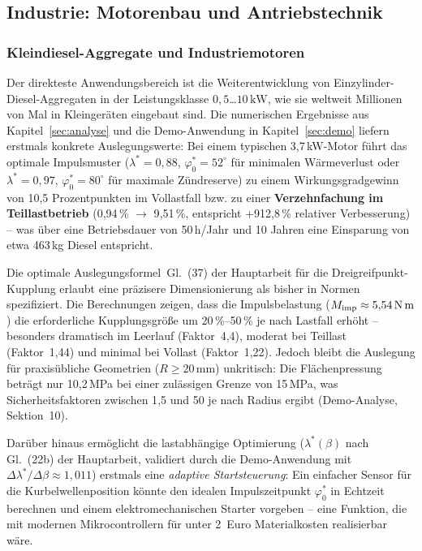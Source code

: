 ﻿\documentclass[a4paper,12pt]{article}
\begin{document}
\subsection{Industrie: Motorenbau und Antriebstechnik}

\subsubsection{Kleindiesel-Aggregate und Industriemotoren}

Der direkteste Anwendungsbereich ist die Weiterentwicklung von
Einzylinder-Diesel-Aggregaten in der Leistungsklasse
$0{,}5$\ldots$10\,\text{kW}$, wie sie weltweit Millionen von Mal in
Kleingeräten eingebaut sind. Die numerischen Ergebnisse aus
Kapitel~\ref{sec:analyse} und die Demo-Anwendung in Kapitel~\ref{sec:demo}
liefern erstmals konkrete Auslegungswerte: Bei einem typischen 3,7\,kW-Motor
führt das optimale Impulsmuster ($\lambda^* = 0{,}88$, $\varphi_0^* = 52^\circ$
für minimalen Wärmeverlust oder $\lambda^* = 0{,}97$, $\varphi_0^* = 80^\circ$
für maximale Zündreserve) zu einem Wirkungsgradgewinn von 10{,}5 Prozentpunkten
im Vollastfall bzw. zu einer \textbf{Verzehnfachung im Teillastbetrieb}
(0{,}94\,\% $\rightarrow$ 9{,}51\,\%, entspricht +912{,}8\,\% relativer
Verbesserung) -- was über eine Betriebsdauer von 50\,h/Jahr und 10 Jahren
eine Einsparung von etwa 463\,kg Diesel entspricht.

Die optimale Auslegungsformel~Gl.~(37) der Hauptarbeit für die
Dreigreifpunkt-Kupplung erlaubt eine präzisere Dimensionierung
als bisher in Normen spezifiziert. Die Berechnungen zeigen, dass
die Impulsbelastung ($M_\text{imp} \approx 5{,}54\,\text{N\,m}$)
die erforderliche Kupplungsgröße um 20\,\%--50\,\% je nach Lastfall erhöht --
besonders dramatisch im Leerlauf (Faktor~4{,}4), moderat bei Teillast
(Faktor~1{,}44) und minimal bei Vollast (Faktor~1{,}22). Jedoch bleibt
die Auslegung für praxisübliche Geometrien ($R \geq 20\,\text{mm}$) unkritisch:
Die Flächenpressung beträgt nur 10{,}2\,MPa bei einer zulässigen Grenze
von 15\,MPa, was Sicherheitsfaktoren zwischen 1{,}5 und 50 je nach Radius
ergibt (Demo-Analyse, Sektion~10).

Darüber hinaus ermöglicht die lastabhängige Optimierung ($\lambda^*(\beta)$
nach Gl.~(22b) der Hauptarbeit, validiert durch die Demo-Anwendung mit
$\Delta\lambda^*/\Delta\beta \approx 1{,}011$) erstmals eine
\textit{adaptive Startsteuerung}: Ein einfacher Sensor für die Kurbelwellenposition
könnte den idealen Impulszeitpunkt $\varphi_0^*$ in Echtzeit berechnen und
einem elektromechanischen Starter vorgeben -- eine Funktion, die mit modernen
Mikrocontrollern für unter 2~Euro Materialkosten realisierbar wäre.
\end{document}
